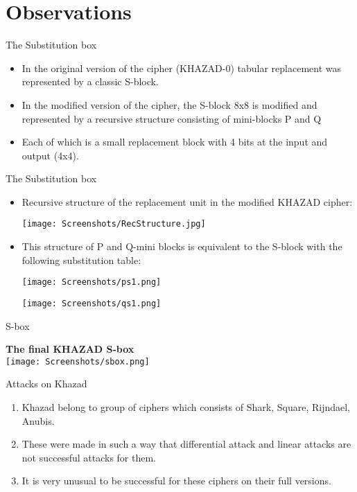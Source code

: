\section{Observations}

\begin{frame}{The Substitution box}
\begin{itemize}
    \item In the original version of the cipher (KHAZAD-0) tabular replacement was represented by a classic S-block.
    \item In the modified version of the cipher, the S-block 8x8 is modified and represented by a recursive structure consisting of mini-blocks P and Q
    \item Each of which is a small replacement block with 4 bits at the input and output (4x4).
\end{itemize}
\end{frame}

\begin{frame}{The Substitution box}
\begin{itemize}
    \item Recursive structure of the replacement unit in the modified KHAZAD cipher: \\
\begin{center}
    \texttt{[image: Screenshots/RecStructure.jpg]}
\end{center} 

\item This structure of P and Q-mini blocks is equivalent to the S-block with the following substitution table:
\begin{center}
    \texttt{[image: Screenshots/ps1.png]}
\end{center}
\begin{center}
    \texttt{[image: Screenshots/qs1.png]}
\end{center}
\end{itemize}
\end{frame}

\begin{frame}{S-box}
\begin{center}
    \textbf{The final KHAZAD S-box}\\
    \texttt{[image: Screenshots/sbox.png]}    
\end{center}
\end{frame}


\begin{frame}{Attacks on Khazad}
\begin{enumerate}
    \item Khazad belong to group of ciphers which consists of Shark, Square, Rijndael, Anubis.
    \item These were made in such a way that
     differential attack and linear attacks are not successful attacks for them.
     \item It is very unusual to be successful for these ciphers on their full versions.
\end{enumerate}
\end{frame}

